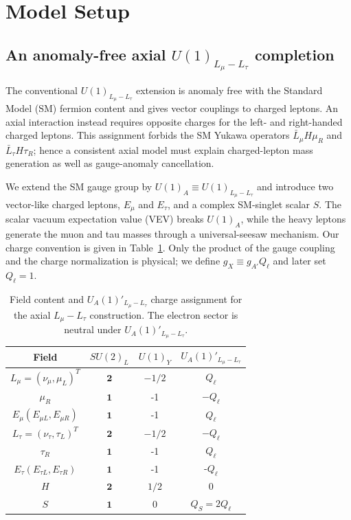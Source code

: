\documentclass[onecolumn, aps, nofootinbib, prd, preprint, floats, floatfix, amsmath, amssymb, superscriptaddress, preprintnumbers]{revtex4-2}
\begin{document}
\section{Model Setup}
\label{sec:model-setup}

\subsection{An anomaly-free axial $U(1)_{L_\mu-L_\tau}$ completion}

The conventional $U(1)_{L_\mu-L_\tau}$ extension is anomaly free with the
Standard Model (SM) fermion content and gives vector couplings to charged
leptons.  An axial interaction instead requires opposite charges for the
left- and right-handed charged leptons.  This assignment forbids the SM
Yukawa operators $\bar L_\mu H\mu_R$ and $\bar L_\tau H\tau_R$; hence a
consistent axial model must explain charged-lepton mass generation as well as
gauge-anomaly cancellation.

We extend the SM gauge group by $U(1)_A\equiv
U(1)_{L_\mu-L_\tau}$ and introduce two vector-like charged leptons,
$E_\mu$ and $E_\tau$, and a complex SM-singlet scalar $S$.  The scalar vacuum
expectation value (VEV) breaks $U(1)_A$, while the heavy leptons generate the
muon and tau masses through a universal-seesaw mechanism.  Our charge
convention is given in Table~\ref{tab:charge-assignment}.  Only the product of
the gauge coupling and the charge normalization is physical; we define
$g_X\equiv g_{A'}Q_\ell$ and later set $Q_\ell=1$.

\begin{table}[htbp]
    \centering
    \begin{tabular}{cccc}
    \hline
    Field & $SU(2)_L$ & $U(1)_Y$ & $U_A(1)'_{L_\mu-L_\tau}$ \\
    \hline
    $L_{\mu}=\left(\nu_{\mu}, \mu_L\right)^T$ & $\mathbf{2}$ & $-1 / 2$ & $Q_{\ell}$ \\
    \hline
    $\mu_R$ & $\mathbf{1}$ & -1 & $-Q_\ell$ \\
    \hline
    $E_\mu\left(E_{\mu L}, E_{\mu R}\right)$ & $\mathbf{1}$ & -1 & $Q_\ell$\\
    \hline
    $L_{\tau}=\left(\nu_{\tau}, \tau_L\right)^T$ & $\mathbf{2}$ & $-1 / 2$ & $-Q_\ell$ \\
    \hline
    $\tau_R$ & $\mathbf{1}$ & -1 & $Q_\ell$ \\
    \hline
    $E_\tau\left(E_{\tau L}, E_{\tau R}\right)$ & $\mathbf{1}$ & -1 & -$Q_\ell$\\
    \hline
    $H$ & $\mathbf{2}$ & $1 / 2$ & 0 \\
    $S$ & $\mathbf{1}$ & 0 & $Q_S=2Q_\ell$\\
    \hline
    \end{tabular}
    \caption{Field content and $U_A(1)'_{L_\mu-L_\tau}$ charge assignment for the axial $L_\mu-L_\tau$ construction. The electron sector is neutral under $U_A(1)'_{L_\mu-L_\tau}$.}
    \label{tab:charge-assignment}
\end{table}
\end{document}
